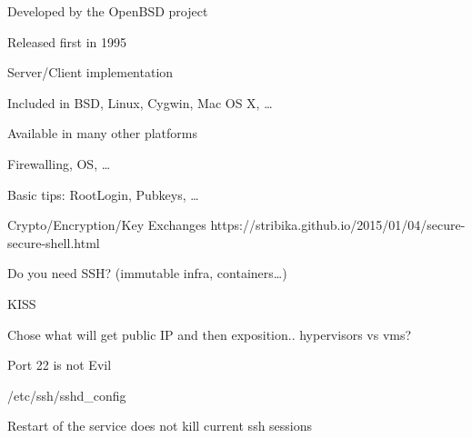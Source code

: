 
\begin{iframe}[OpenSSH]
\item Developed by the OpenBSD project
\item Released first in 1995
\item Server/Client implementation
\item Included in BSD, Linux, Cygwin, Mac OS X, \dots
\item Available in many other platforms
\end{iframe}

\begin{iframe}
\item Firewalling, OS, \dots
\item Basic tips: RootLogin, Pubkeys, \dots
\item Crypto/Encryption/Key Exchanges https://stribika.github.io/2015/01/04/secure-secure-shell.html
\end{iframe}

\begin{iframe}
\item Do you need SSH? (immutable infra, containers\dots)
\item KISS
\item Chose what will get public IP and then exposition.. hypervisors vs vms?
\item Port 22 is not Evil
\end{iframe}

\begin{iframe}
\item /etc/ssh/sshd\_config
\item Restart of the service does not kill current ssh sessions
\end{iframe}

